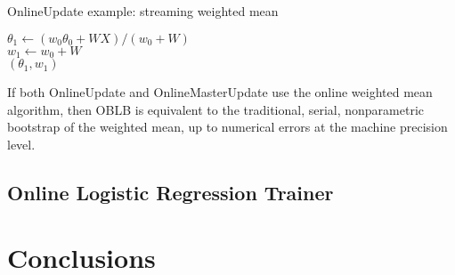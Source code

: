 \documentclass{article}
\begin{document}
\begin{algorithm}
\caption{OnlineUpdate example: streaming weighted mean}
\label{onlineupdate}
\DontPrintSemicolon
{}
$\theta_1 \gets (w_0\theta_0 + WX)/(w_0 + W)$
\\
$w_1 \gets w_0 + W$ 
\\
\Return $(\theta_1, w_1)$
\end{algorithm}

If both OnlineUpdate and OnlineMasterUpdate use the online weighted mean algorithm, 
then OBLB is equivalent to the traditional, serial, nonparametric 
bootstrap of the weighted mean, up to numerical errors at the machine precision
level.

\subsection{Online Logistic Regression Trainer}


\section{Conclusions}





{}

\end{document}
